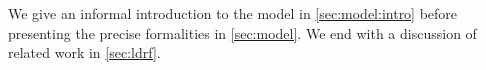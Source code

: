 
We give an informal introduction to the model in \textsection\ref{sec:model:intro} before presenting the precise formalities in \textsection\ref{sec:model}.
We %
end with
a discussion of related work in \textsection\ref{sec:ldrf}.



